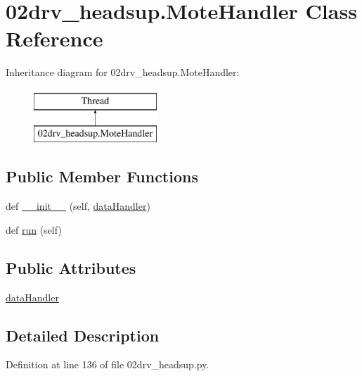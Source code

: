 \hypertarget{class02drv__headsup_1_1_mote_handler}{}\section{02drv\+\_\+headsup.Mote\+Handler Class Reference}
\label{class02drv__headsup_1_1_mote_handler}
Inheritance diagram for 02drv\+\_\+headsup.Mote\+Handler\+:\begin{figure}[H]
\begin{center}
\leavevmode
\includegraphics[height=2.000000cm]{class02drv__headsup_1_1_mote_handler}
\end{center}
\end{figure}
\subsection*{Public Member Functions}
\begin{DoxyCompactItemize}
\item 
def \hyperlink{class02drv__headsup_1_1_mote_handler_a17517712551c3e04ee28b94abab15e9d}{\+\_\+\+\_\+init\+\_\+\+\_\+} (self, \hyperlink{class02drv__headsup_1_1_mote_handler_a6f1c0e47361c7578a6acd364f0d192f5}{data\+Handler})
\item 
def \hyperlink{class02drv__headsup_1_1_mote_handler_a8189feda21538afe87e7985083b34e35}{run} (self)
\end{DoxyCompactItemize}
\subsection*{Public Attributes}
\begin{DoxyCompactItemize}
\item 
\hyperlink{class02drv__headsup_1_1_mote_handler_a6f1c0e47361c7578a6acd364f0d192f5}{data\+Handler}
\end{DoxyCompactItemize}


\subsection{Detailed Description}


Definition at line 136 of file 02drv\+\_\+headsup.\+py.



